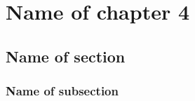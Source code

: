 

\graphicspath{{4/figures/}} %


\chapter{\label{ch4}Name of chapter 4} %

\section{\label{}Name of section}

\subsection{\label{}Name of subsection}




